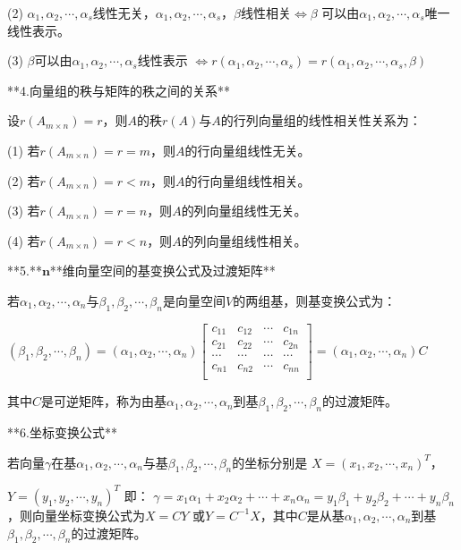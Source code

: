 (2) $\alpha_{1},\alpha_{2},\cdots,\alpha_{s}$线性无关，$\alpha_{1},\alpha_{2},\cdots,\alpha_{s}$，$\beta$线性相关$\Leftrightarrow\beta$ 可以由$\alpha_{1},\alpha_{2},\cdots,\alpha_{s}$唯一线性表示。

(3) $\beta$可以由$\alpha_{1},\alpha_{2},\cdots,\alpha_{s}$线性表示
$\Leftrightarrow r(\alpha_{1},\alpha_{2},\cdots,\alpha_{s}) =r(\alpha_{1},\alpha_{2},\cdots,\alpha_{s},\beta)$

**4.向量组的秩与矩阵的秩之间的关系**

设$r(A_{m \times n}) =r$，则$A$的秩$r(A)$与$A$的行列向量组的线性相关性关系为：

(1) 若$r(A_{m \times n}) = r = m$，则$A$的行向量组线性无关。

(2) 若$r(A_{m \times n}) = r < m$，则$A$的行向量组线性相关。

(3) 若$r(A_{m \times n}) = r = n$，则$A$的列向量组线性无关。

(4) 若$r(A_{m \times n}) = r < n$，则$A$的列向量组线性相关。

**5.**$\mathbf{n}$**维向量空间的基变换公式及过渡矩阵**

若$\alpha_{1},\alpha_{2},\cdots,\alpha_{n}$与$\beta_{1},\beta_{2},\cdots,\beta_{n}$是向量空间$V$的两组基，则基变换公式为：

$(\beta_{1},\beta_{2},\cdots,\beta_{n}) = (\alpha_{1},\alpha_{2},\cdots,\alpha_{n})\begin{bmatrix}  c_{11}& c_{12}& \cdots & c_{1n} \\  c_{21}& c_{22}&\cdots & c_{2n} \\ \cdots & \cdots & \cdots & \cdots \\  c_{n1}& c_{n2} & \cdots & c_{{nn}} \\\end{bmatrix} = (\alpha_{1},\alpha_{2},\cdots,\alpha_{n})C$

其中$C$是可逆矩阵，称为由基$\alpha_{1},\alpha_{2},\cdots,\alpha_{n}$到基$\beta_{1},\beta_{2},\cdots,\beta_{n}$的过渡矩阵。

**6.坐标变换公式**

若向量$\gamma$在基$\alpha_{1},\alpha_{2},\cdots,\alpha_{n}$与基$\beta_{1},\beta_{2},\cdots,\beta_{n}$的坐标分别是
$X = {(x_{1},x_{2},\cdots,x_{n})}^{T}$，

$Y = \left( y_{1},y_{2},\cdots,y_{n} \right)^{T}$ 即： $\gamma =x_{1}\alpha_{1} + x_{2}\alpha_{2} + \cdots + x_{n}\alpha_{n} = y_{1}\beta_{1} +y_{2}\beta_{2} + \cdots + y_{n}\beta_{n}$，则向量坐标变换公式为$X = CY$ 或$Y = C^{- 1}X$，其中$C$是从基$\alpha_{1},\alpha_{2},\cdots,\alpha_{n}$到基$\beta_{1},\beta_{2},\cdots,\beta_{n}$的过渡矩阵。

